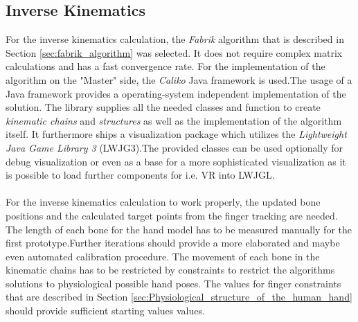 \subsection{Inverse Kinematics}
For the inverse kinematics calculation, the \textit{Fabrik} algorithm that is described in Section  \ref{sec:fabrik_algorithm} was selected. It does not require complex matrix calculations and has a fast convergence rate. For the implementation of the algorithm on the "Master" side, the \textit{Caliko} Java framework \cite{Lansley.2016} is used.The usage of a Java framework provides a operating-system independent implementation of the solution. The library supplies all the needed classes and function to create \textit{kinematic chains} and \textit{structures} as well as the implementation of the algorithm itself. It furthermore ships a visualization package which utilizes the \textit{Lightweight Java Game Library 3} (LWJG3).The provided classes can be used optionally for debug visualization or even as a base for a more sophisticated visualization as it is possible to load further components for i.e. VR into LWJGL.\\\\
For the inverse kinematics calculation to work properly, the updated bone positions and the calculated target points from the finger tracking are needed.
The length of each bone for the hand model has to be measured manually for the first prototype.Further iterations should provide a more elaborated and maybe even automated calibration procedure. The movement of each bone in the kinematic chains has to be restricted by constraints to restrict the algorithms solutions to physiological possible hand poses. The values for finger constraints that are described in Section \ref{sec:Physiological_structure_of_the_human_hand} should provide sufficient starting values values. 